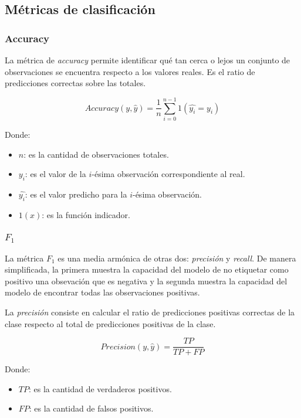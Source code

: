 \subsection{Métricas de clasificación}
\subsubsection{Accuracy}

La m\'etrica de {\it accuracy} permite identificar qu\'e tan cerca o lejos un conjunto de observaciones se encuentra
respecto a los valores reales. Es el ratio de predicciones correctas sobre las totales.

\begin{equation}
    Accuracy(y, \hat{y}) = \frac{1}{n} \sum_{i=0}^{n-1} 1(\hat{y_{i}}=y_{i})
\end{equation}

Donde:
\begin{itemize}
    \item $n$: es la cantidad de observaciones totales.
    \item $y_{i}$: es el valor de la ${i}$-\'esima observaci\'on correspondiente al real.
    \item $\hat{y_{i}}$: es el valor predicho para la ${i}$-\'esima observaci\'on.
    \item $1(x)$: es la funci\'on indicador.
\end{itemize}

\subsubsection{$F_{1}$}

La m\'etrica $F_{1}$ es una media arm\'onica de otras dos: {\it precisi\'on} y {\it recall}. De manera simplificada, la
primera muestra la capacidad del modelo de no etiquetar como positivo una obsevaci\'on que es negativa y la segunda
muestra la capacidad del modelo de encontrar todas las observaciones positivas.

La {\it precisi\'on} consiste en calcular el ratio de predicciones positivas correctas de la clase respecto al total de
predicciones positivas de la clase.

\begin{equation}
    Precision(y, \hat{y}) = \frac{TP}{TP + FP}
\end{equation}

Donde:
\begin{itemize}
    \item $TP$: es la cantidad de verdaderos positivos.
    \item $FP$: es la cantidad de falsos positivos.
\end{itemize}

